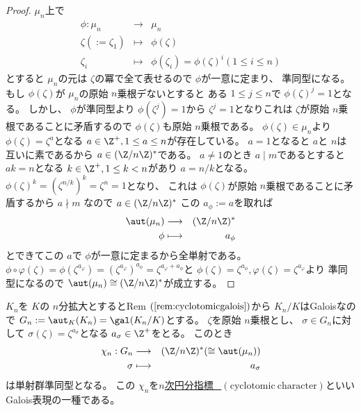 \documentclass[../master_galois_theory]{subfiles}
\begin{document}
\begin{proof}
  $\mu_n$上で
  \begin{eqnarray*}
    \phi : \mu_n & \longrightarrow & \mu_n \\
    \zeta ( := \zeta_1) & \longmapsto & \phi(\zeta) \\
    \zeta_i & \longmapsto & \phi(\zeta_i) = \phi(\zeta)^i (1 \leq i \leq n)
  \end{eqnarray*}
  とすると $\mu_n$の元は $\zeta$の冪で全て表せるので $\phi$が一意に定まり、
  準同型になる。
  もし $\phi(\zeta)$が $\mu_n$の原始 $n$乗根デないとすると
  ある $ 1 \leq j \leq n$で $\phi(\zeta)^j = 1$となる。
  しかし、 $\phi$が準同型より $\phi(\zeta^j) = 1$から $\zeta^j = 1$となりこれは
  $\zeta$が原始 $n$乗根であることに矛盾するので $\phi(\zeta)$も原始 $n$乗根である。
  $\phi(\zeta) \in \mu_n$より $\phi(\zeta) = \zeta^a$となる $a \in \Z^+ , 1 \leq a \leq n$が存在している。
  $a = 1$となると $a$と $n$は互いに素であるから $a \in (\Z/n\Z)^*$である。
  $a \neq 1$のとき $a \mid m$であるとすると $ak = n$となる $k \in \Z^+ , 1 \leq k < n$があり $a = n/k$となる。
  $\phi(\zeta)^k = (\zeta^{n/k})^k = \zeta^n = 1$となり、
  これは $\phi(\zeta)$が原始 $n$乗根であることに矛盾するから $a \nmid m$
  なので $a \in (\Z/n\Z)^*$
  この $a_\phi := a$を取れば
  \begin{eqnarray*}
    \aut(\mu_n) & \longrightarrow & (\Z/n\Z)^* \\
    \phi & \longmapsto & a_\phi
  \end{eqnarray*}
  とできてこの $a$で $\phi$が一意に定まるから全単射である。
  $\phi \circ \varphi (\zeta) = \phi(\zeta^{a_\varphi}) = (\zeta^{a_\varphi})^{a_\phi} = \zeta^{a_\varphi + a_\phi}$と
  $\phi(\zeta) = \zeta^{a_\phi} , \varphi(\zeta) = \zeta^{a_\varphi}$より
  準同型になるので
  $\aut(\mu_n) \cong (\Z/n\Z)^*$が成立する。
\end{proof}

\begin{prop}
  $K_n$を $K$の $n$分拡大とすると\rm{Rem} $(\mathrm{\ref{rem:cyclotomicgalois}})$から $K_n/K$は\rm{Galois}なので
  $G_n := \aut_K(K_n) = \gal(K_n/K)$とする。
  $\zeta$を原始 $n$乗根とし、 $\sigma \in G_n$に対して
  $\sigma(\zeta) = \zeta^{a_\sigma}$となる $a_\sigma \in \Z^+$をとる。
  このとき
  \begin{eqnarray*}
    \chi_n : G_n & \longrightarrow & (\Z/n\Z)^* (\cong \aut(\mu_n)) \\
    \sigma & \longmapsto & a_\sigma
  \end{eqnarray*}
  は単射群準同型となる。
  この $\chi_n$を\underline{$n$次円分指標 \  $(\mathrm{cyclotomic \  character})$}といい\rm{Galois}表現の一種である。
\end{prop}
\end{document}
